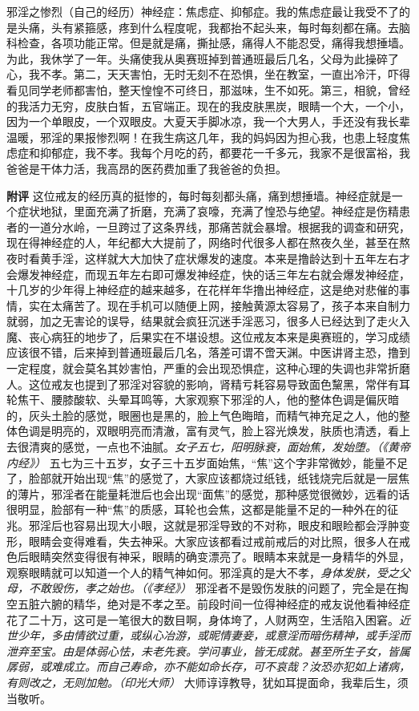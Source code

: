 \begin{case}
    邪淫之惨烈（自己的经历）神经症：焦虑症、抑郁症。我的焦虑症最让我受不了的是头痛，头有紧箍感，疼到什么程度呢，我都抬不起头来，每时每刻都在痛。去脑科检查，各项功能正常。但是就是痛，撕扯感，痛得人不能忍受，痛得我想捶墙。为此，我休学了一年。头痛使我从奥赛班掉到普通班最后几名，父母为此操碎了心，我不孝。第二，天天害怕，无时无刻不在恐惧，坐在教室，一直出冷汗，吓得看见同学老师都害怕，整天惶惶不可终日，那滋味，生不如死。第三，相貌，曾经的我活力无穷，皮肤白皙，五官端正。现在的我皮肤黑炭，眼睛一个大，一个小，因为一个单眼皮，一个双眼皮。大夏天手脚冰凉，我一个大男人，手还没有我长辈温暖，邪淫的果报惨烈啊！在我生病这几年，我的妈妈因为担心我，也患上轻度焦虑症和抑郁症，我不孝。我每个月吃的药，都要花一千多元，我家不是很富裕，我爸爸是干体力活，我高昂的医药费加重了我爸爸的负担。

    \textbf{附评} 这位戒友的经历真的挺惨的，每时每刻都头痛，痛到想捶墙。神经症就是一个症状地狱，里面充满了折磨，充满了哀嚎，充满了惶恐与绝望。神经症是伤精患者的一道分水岭，一旦跨过了这条界线，那痛苦就会暴增。根据我的调查和研究，现在得神经症的人，年纪都大大提前了，网络时代很多人都在熬夜久坐，甚至在熬夜时看黄手淫，这样就大大加快了症状爆发的速度。本来是撸龄达到十五年左右才会爆发神经症，而现五年左右即可爆发神经症，快的话三年左右就会爆发神经症，十几岁的少年得上神经症的越来越多，在花样年华撸出神经症，这是绝对悲催的事情，实在太痛苦了。现在手机可以随便上网，接触黄源太容易了，孩子本来自制力就弱，加之无害论的误导，结果就会疯狂沉迷手淫恶习，很多人已经达到了走火入魔、丧心病狂的地步了，后果实在不堪设想。这位戒友本来是奥赛班的，学习成绩应该很不错，后来掉到普通班最后几名，落差可谓不啻天渊。中医讲肾主恐，撸到一定程度，就会莫名其妙害怕，严重的会出现恐惧症，这种心理的失调也非常折磨人。这位戒友也提到了邪淫对容貌的影响，肾精亏耗容易导致面色黧黑，常伴有耳轮焦干、腰膝酸软、头晕耳鸣等，大家观察下邪淫的人，他的整体色调是偏灰暗的，灰头土脸的感觉，眼圈也是黑的，脸上气色晦暗，而精气神充足之人，他的整体色调是明亮的，双眼明亮而清澈，富有灵气，脸上容光焕发，肤质也清透，看上去很清爽的感觉，一点也不油腻。\textit{女子五七，阳明脉衰，面始焦，发始堕。（《黄帝内经》）} 五七为三十五岁，女子三十五岁面始焦，“焦”这个字非常微妙，能量不足了，脸部就开始出现“焦”的感觉了，大家应该都烧过纸钱，纸钱烧完后就是一层焦的薄片，邪淫者在能量耗泄后也会出现“面焦”的感觉，那种感觉很微妙，远看的话很明显，脸部有一种“焦”的质感，耳轮也会焦，这都是能量不足的一种外在的征兆。邪淫后也容易出现大小眼，这就是邪淫导致的不对称，眼皮和眼睑都会浮肿变形，眼睛会变得难看，失去神采。大家应该都看过戒前戒后的对比照，很多人在戒色后眼睛突然变得很有神采，眼睛的确变漂亮了。眼睛本来就是一身精华的外显，观察眼睛就可以知道一个人的精气神如何。邪淫真的是大不孝，\textit{身体发肤，受之父母，不敢毁伤，孝之始也。（《孝经》）} 邪淫者不是毁伤发肤的问题了，完全是在掏空五脏六腑的精华，绝对是不孝之至。前段时间一位得神经症的戒友说他看神经症花了二十万，这可是一笔很大的数目啊，身体垮了，人财两空，生活陷入困窘。\textit{近世少年，多由情欲过重，或纵心冶游，或昵情妻妾，或意淫而暗伤精神，或手淫而泄弃至宝。由是体弱心怯，未老先衰。学问事业，皆无成就。甚至所生子女，皆属孱弱，或难成立。而自己寿命，亦不能如命长存，可不哀哉？汝恐亦犯如上诸病，有则改之，无则加勉。（印光大师）} 大师谆谆教导，犹如耳提面命，我辈后生，须当敬听。
\end{case}

